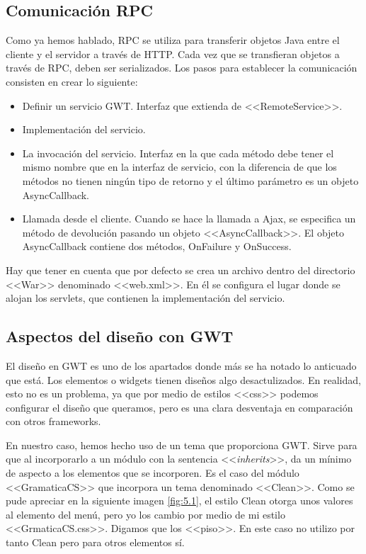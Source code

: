 \subsection{Comunicación RPC}

Como ya hemos hablado, RPC se utiliza para transferir objetos Java entre el cliente y el servidor a través de HTTP. Cada vez que se transfieran objetos a través de RPC, deben ser serializados. Los pasos para establecer la comunicación consisten en crear lo siguiente:

\begin{itemize}
\item Definir un servicio GWT. Interfaz que extienda de <<RemoteService>>. 
\item Implementación del servicio.
\item La invocación del servicio. Interfaz en la que cada método debe tener el mismo nombre que en la interfaz de servicio, con la diferencia de que los métodos no tienen ningún tipo de retorno y el último parámetro es un objeto AsyncCallback.
\item Llamada desde el cliente. Cuando se hace la llamada a Ajax, se especifica un método de devolución pasando un objeto <<AsyncCallback>>. El objeto AsyncCallback contiene dos métodos, OnFailure y OnSuccess.
\end{itemize}

Hay que tener en cuenta que por defecto se crea un archivo dentro del directorio <<War>> denominado <<web.xml>>. En él se configura el lugar donde se alojan los servlets, que contienen la implementación del servicio.


\subsection{Aspectos del diseño con GWT}

El diseño en GWT es uno de los apartados donde más se ha notado lo anticuado que está. Los elementos o widgets tienen diseños algo desactulizados. En realidad, esto no es un problema, ya que por medio de estilos <<css>> podemos configurar el diseño que queramos, pero es una clara desventaja en comparación con otros frameworks.

En nuestro caso, hemos hecho uso de un tema que proporciona GWT. Sirve para que al incorporarlo a un módulo con la sentencia <<\textit{inherits}>>, da un mínimo de aspecto a los elementos que se incorporen. Es el caso del módulo <<GramaticaCS>> que incorpora un tema denominado <<Clean>>. Como se pude apreciar en la siguiente imagen \ref{fig:5.1}, el estilo Clean otorga unos valores al elemento del menú, pero yo los cambio por medio de mi estilo <<GrmaticaCS.css>>. Digamos que los <<piso>>. En este caso no utilizo por tanto Clean pero para otros elementos sí.

